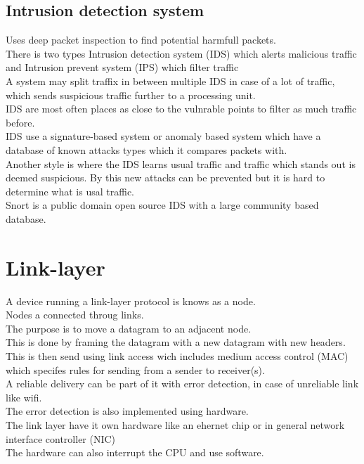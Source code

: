 \documentclass[12pt, a4paper]{article}
\begin{document}
		\subsection{Intrusion detection system}
			Uses deep packet inspection to find potential harmfull packets.\\
			There is two types Intrusion detection system (IDS) which alerts malicious traffic and Intrusion prevent system (IPS) which filter traffic\\
			A system may split traffix in between multiple IDS in case of a lot of traffic, which sends suspicious traffic further to a processing unit.\\
			IDS are most often places as close to the vulnrable points to filter as much traffic before.\\
			IDS use a signature-based system or anomaly based system which have a database of known attacks types which it compares packets with.\\
			Another style is where the IDS learns usual traffic and traffic which stands out is deemed suspicious. By this new attacks can be prevented but it is hard to determine what is usal traffic.\\
			Snort is a public domain open source IDS with a large community based database.
	\section{Link-layer}
		A device running a link-layer protocol is knows as a node.\\
		Nodes a connected throug links.\\
		The purpose is to move a datagram to an adjacent node.\\
		This is done by framing the datagram with a new datagram with new headers.\\
		This is then send using link access wich includes medium access control (MAC) which specifes rules for sending from a sender to receiver(s).\\
		A reliable delivery can be part of it with error detection, in case of unreliable link like wifi.\\
		The error detection is also implemented using hardware.\\
		The link layer have it own hardware like an ehernet chip or in general network interface controller (NIC)\\
		The hardware can also interrupt the CPU and use software.\\
\end{document}

